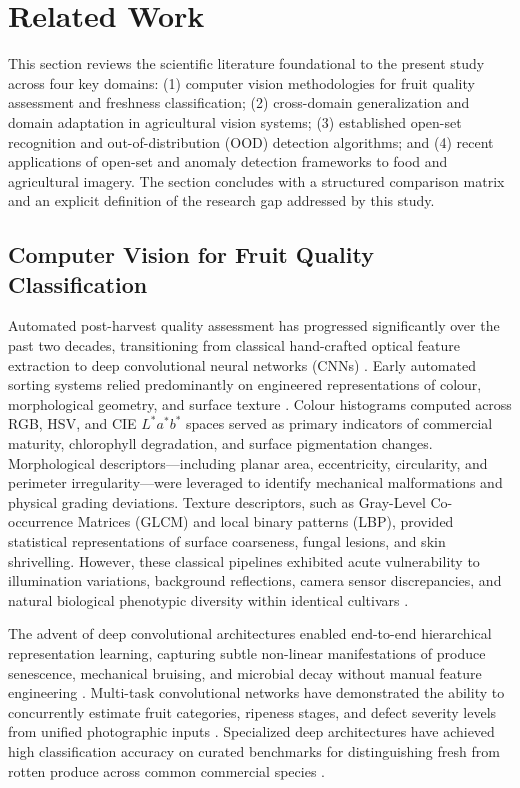 \section{Related Work}
\label{sec:related_work}

This section reviews the scientific literature foundational to the present study across four key domains: (1) computer vision methodologies for fruit quality assessment and freshness classification; (2) cross-domain generalization and domain adaptation in agricultural vision systems; (3) established open-set recognition and out-of-distribution (OOD) detection algorithms; and (4) recent applications of open-set and anomaly detection frameworks to food and agricultural imagery. The section concludes with a structured comparison matrix and an explicit definition of the research gap addressed by this study.

\subsection{Computer Vision for Fruit Quality Classification}
\label{sec:cv_fruit_quality}

Automated post-harvest quality assessment has progressed significantly over the past two decades, transitioning from classical hand-crafted optical feature extraction to deep convolutional neural networks (CNNs) \cite{rizzo2023fruit}. Early automated sorting systems relied predominantly on engineered representations of colour, morphological geometry, and surface texture \cite{rizzo2023fruit}. Colour histograms computed across RGB, HSV, and CIE $L^*a^*b^*$ spaces served as primary indicators of commercial maturity, chlorophyll degradation, and surface pigmentation changes. Morphological descriptors---including planar area, eccentricity, circularity, and perimeter irregularity---were leveraged to identify mechanical malformations and physical grading deviations. Texture descriptors, such as Gray-Level Co-occurrence Matrices (GLCM) and local binary patterns (LBP), provided statistical representations of surface coarseness, fungal lesions, and skin shrivelling. However, these classical pipelines exhibited acute vulnerability to illumination variations, background reflections, camera sensor discrepancies, and natural biological phenotypic diversity within identical cultivars \cite{rizzo2023fruit}.

The advent of deep convolutional architectures enabled end-to-end hierarchical representation learning, capturing subtle non-linear manifestations of produce senescence, mechanical bruising, and microbial decay without manual feature engineering \cite{rizzo2023fruit,zhang2024fruit}. Multi-task convolutional networks have demonstrated the ability to concurrently estimate fruit categories, ripeness stages, and defect severity levels from unified photographic inputs \cite{zhang2024fruit}. Specialized deep architectures have achieved high classification accuracy on curated benchmarks for distinguishing fresh from rotten produce across common commercial species \cite{chen2024classification,gulzar2023fruit}.

